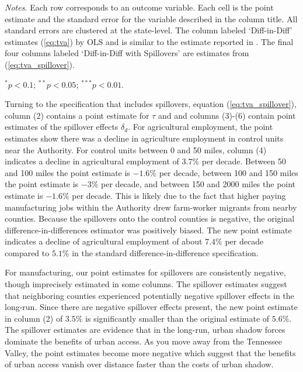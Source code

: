 \documentclass[11pt]{article}
\begin{document}
\begin{table}[!tb]
\begin{adjustbox}{width = \textwidth, center}
\begin{threeparttable}
            \begin{tablenotes}\footnotesize
                \item \textit{Notes.} Each row corresponds to an outcome variable. Each cell is the point estimate and the standard error for the variable described in the column title. All standard errors are clustered at the state-level. The column labeled `Diff-in-Diff' estimates (\ref{eq:tva}) by OLS and is similar to the estimate reported in \citet{Kline_Moretti_2014}. The final four columns labeled `Diff-in-Diff with Spillovers' are estimates from (\ref{eq:tva_spillover}).
                
                \item $^{*} p< 0.1$; $^{**} p < 0.05$; $^{***} p < 0.01$.
            \end{tablenotes}
        \end{threeparttable}
    \end{adjustbox}
\end{table}

Turning to the specification that includes spillovers, equation (\ref{eq:tva_spillover}), column (2) contains a point estimate for $\tau$ and and columns (3)-(6) contain point estimates of the spillover effects $\delta_d$. For agricultural employment, the point estimates show there was a decline in agriculture employment in control units near the Authority. For control units between 0 and 50 miles, column (4) indicates a decline in agricultural employment of $3.7\%$ per decade. Between 50 and 100 miles the point estimate is $-1.6\%$ per decade, between 100 and 150 miles the point estimate is $-3\%$ per decade, and between 150 and 2000 miles the point estimate is $-1.6\%$ per decade. This is likely due to the fact that higher paying manufacturing jobs within the Authority drew farm-worker migrants from nearby counties. Because the spillovers onto the control counties is negative, the original difference-in-differences estimator was positively biased. The new point estimate indicates a decline of agricultural employment of about $7.4\%$ per decade compared to $5.1\%$ in the standard difference-in-difference specification. 

For manufacturing, our point estimates for spillovers are consistently negative, though imprecisely estimated in some columns. The spillover estimates suggest that neighboring counties experienced potentially negative spillover effects in the long-run. Since there are negative spillover effects present, the new point estimate in column (2) of $3.5\%$ is significantly smaller than the original estimate of $5.6\%$. The spillover estimates are evidence that in the long-run, urban shadow forces dominate the benefits of urban access. As you move away from the Tennessee Valley, the point estimates become more negative which suggest that the benefits of urban access vanish over distance faster than the costs of urban shadow.
\end{document}

